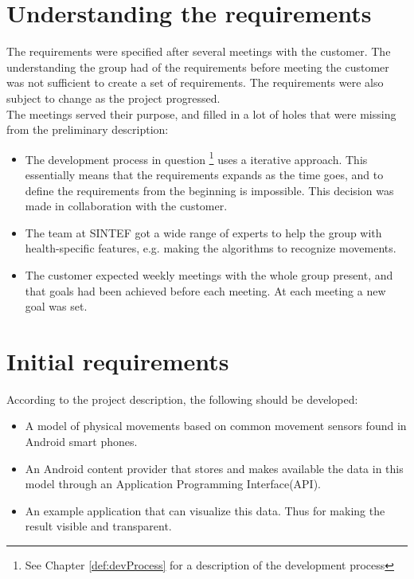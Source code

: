 \section{Understanding the requirements}

The requirements were specified after several meetings with the customer. The understanding the group had of the requirements before meeting the customer was not sufficient to create a set of requirements. The requirements were also subject to change as the project progressed. \\

The meetings served their purpose, and filled in a lot of holes that were missing from the preliminary description:
\begin{itemize}
\item The development process in question \footnote{See Chapter \ref{def:devProcess} for a description of the development process} uses a iterative approach. This essentially means that the requirements expands as the time goes, and to define the requirements from the beginning is impossible. This decision was made in collaboration with the customer.
\item The team at SINTEF got a wide range of experts to help the group with health-specific features, e.g. making the algorithms to recognize movements.
\item The customer expected weekly meetings with the whole group present, and that goals had been achieved before each meeting. At each meeting a new goal was set.
\end{itemize}

\section{Initial requirements}

According to the project description, the following should be developed:
\begin{itemize}
\item A model of physical movements based on common movement sensors found in Android smart phones.
\item An Android content provider that stores and makes available the data in this model through an Application Programming Interface(API).
\item An example application that can visualize this data. Thus for making the result visible and transparent.
\end{itemize}
